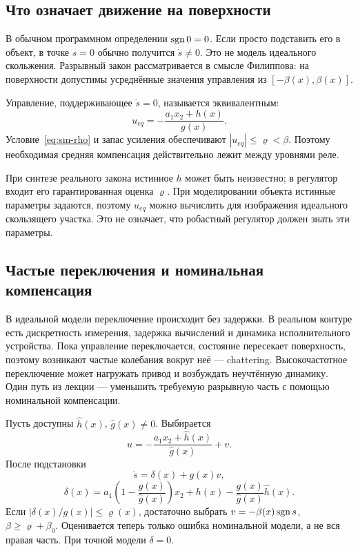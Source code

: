 \subsection{Что означает движение на поверхности}
\addition В обычном программном определении $\operatorname{sgn}0=0$. Если просто подставить
его в объект, в точке $s=0$ обычно получится $\dot s\ne0$. Это не модель
идеального скольжения. Разрывный закон рассматривается в смысле Филиппова:
на поверхности допустимы усреднённые значения управления из
$[-\beta(x),\beta(x)]$.

Управление, поддерживающее $\dot s=0$, называется эквивалентным:
\[
 u_{eq}=-\frac{a_1x_2+h(x)}{g(x)}.
\]
Условие~\eqref{eq:sm-rho} и запас усиления обеспечивают
$|u_{eq}|\le\varrho<\beta$. Поэтому необходимая средняя компенсация
действительно лежит между уровнями реле.

При синтезе реального закона истинное $h$ может быть неизвестно;
в регулятор входит его гарантированная оценка $\varrho$.
При моделировании объекта истинные параметры задаются, поэтому
$u_{eq}$ можно вычислить для изображения идеального скользящего участка.
Это не означает, что робастный регулятор должен знать эти параметры.

\subsection{Частые переключения и номинальная компенсация}

В идеальной модели переключение происходит без задержки. В реальном контуре
есть дискретность измерения, задержка вычислений и динамика исполнительного
устройства. Пока управление переключается, состояние пересекает поверхность,
поэтому возникают частые колебания вокруг неё --- chattering.
Высокочастотное переключение может нагружать привод и возбуждать
неучтённую динамику. Один путь из лекции --- уменьшить требуемую разрывную
часть с помощью номинальной компенсации.

Пусть доступны $\hat h(x)$, $\hat g(x)\ne0$. Выбирается
\begin{equation}
 u=-\frac{a_1x_2+\hat h(x)}{\hat g(x)}+v.
 \label{eq:sm-nominal}
\end{equation}
После подстановки
\[
 \dot s=\delta(x)+g(x)v,
\]
\[
 \delta(x)=a_1\left(1-\frac{g(x)}{\hat g(x)}\right)x_2
       +h(x)-\frac{g(x)}{\hat g(x)}\hat h(x).
\]
Если $|\delta(x)/g(x)|\le\varrho(x)$, достаточно выбрать
$v=-\beta(x)\operatorname{sgn} s$, $\beta\ge\varrho+\beta_0$.
Оценивается теперь только ошибка номинальной модели, а не вся правая часть.
При точной модели $\delta=0$.

